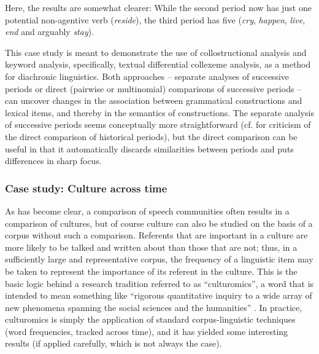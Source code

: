 
Here, the results are somewhat clearer: While the second period now has just one potential non\hyp{}agentive  verb  (\textit{reside}), the third period has five (\textit{cry}, \textit{happen}, \textit{live}, \textit{end} and arguably \textit{stay}).

This case study is meant to demonstrate the use of collostructional  analysis and keyword  analysis, specifically, textual differential collexeme  analysis, as a method for diachronic  linguistics. Both approaches -- separate analyses of successive periods or direct (pairwise or multinomial) comparisons of successive periods -- can uncover changes in the association  between grammatical  constructions and lexical items, and thereby in the semantics  of constructions. The separate analysis of successive periods seems conceptually more straightforward (cf. \citealt{stefanowitsch_distinctive_2006} for criticism of the direct comparison of historical periods), but the direct comparison can be useful in that it automatically discards similarities between periods and puts differences in sharp focus.

\subsubsection{Case study: Culture across time}
\label{sec:cultureacrosstime}

As has become clear, a comparison of speech communities often results in a comparison of cultures,  but of course culture can also be studied on the basis of a corpus without such a comparison. Referents that are important in a culture are more likely to be talked and written about than those that are not; thus, in a sufficiently large  and representative  corpus, the frequency  of a linguistic item may be taken to represent the importance of its referent in the culture. This is the basic logic behind a research tradition referred to as ``culturomics'',  a word that is intended to mean something like ``rigorous quantitative  inquiry to a wide array of new phenomena spanning the social sciences and the humanities''  \citep[176]{michel_quantitative_2011}. In practice, culturomics is simply the application of standard corpus\hyp{}linguistic techniques (word frequencies,  tracked across time), and it has yielded some interesting results (if applied carefully, which is not always the case).

